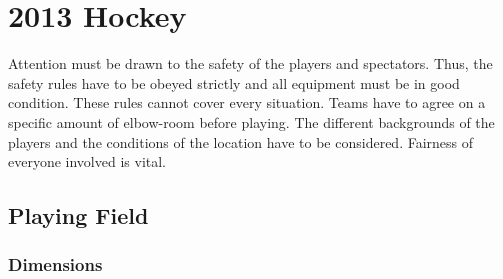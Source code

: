 \chapter{2013 Hockey \label{chap:hockey}}

Attention must be drawn to the safety of the players and spectators.
Thus, the safety rules have to be obeyed strictly and all equipment must be in good condition.
These rules cannot cover every situation.
Teams have to agree on a specific amount of elbow-room before playing.
The different backgrounds of the players and the conditions of the location have to be considered.
Fairness of everyone involved is vital.

\section{Playing Field}

\subsection{Dimensions}


